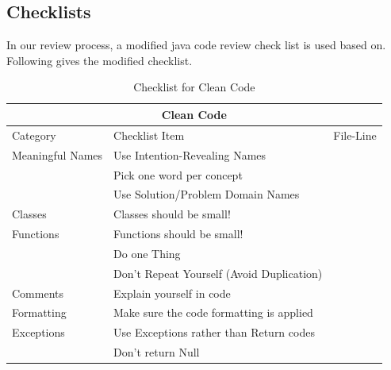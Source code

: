 \documentclass[15pt]{article}
\begin{document}
\begin{CJK*}{UTF8}{gbsn}
{\subsection{Checklists}
In our review process, a modified java code review check list is used based on\cite{2}. Following gives the modified checklist.
\begin{table}[htp]
\centering
\caption{Checklist for Clean Code}
\begin{tabular}{@{}|l|l|l|@{}}
\toprule
\multicolumn{3}{|c|}{Clean Code}                                         \\ \midrule
Category         & Checklist Item                            & File-Line \\ \midrule
Meaningful Names & Use Intention-Revealing Names             &           \\ \midrule
                 & Pick one word per concept                 &           \\ \midrule
                 & Use Solution/Problem Domain Names         &           \\ \midrule
Classes          & Classes should be small!                  &           \\ \midrule
Functions        & Functions should be small!                &           \\ \midrule
                 & Do one Thing                              &           \\ \midrule
                 & Don't Repeat Yourself (Avoid Duplication) &           \\ \midrule
Comments         & Explain yourself in code                  &           \\ \midrule
Formatting       & Make sure the code formatting is applied  &           \\ \midrule
Exceptions       & Use Exceptions rather than Return codes   &           \\ \midrule
                 & Don't return Null                         &           \\ \bottomrule
\end{tabular}
\end{table}

}
\end{CJK*}
\end{document}
